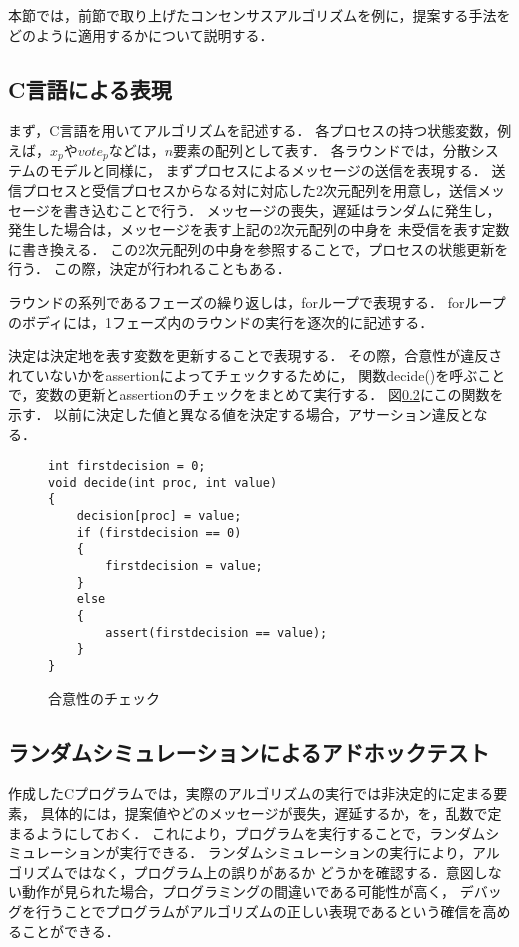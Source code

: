 \documentclass[technicalreport]{ieicej}
\theoremstyle{plain}
\begin{document}
本節では，前節で取り上げたコンセンサスアルゴリズムを例に，提案する手法をどのように適用するかについて説明する．

\subsection{C言語による表現}


まず，C言語を用いてアルゴリズムを記述する．
各プロセスの持つ状態変数，例えば，$x_p$や$vote_p$などは，$n$要素の配列として表す．
各ラウンドでは，分散システムのモデルと同様に，
まずプロセスによるメッセージの送信を表現する．
送信プロセスと受信プロセスからなる対に対応した2次元配列を用意し，送信メッセージを書き込むことで行う．
メッセージの喪失，遅延はランダムに発生し，発生した場合は，メッセージを表す上記の2次元配列の中身を
未受信を表す定数に書き換える．
この2次元配列の中身を参照することで，プロセスの状態更新を行う．
この際，決定が行われることもある．

ラウンドの系列であるフェーズの繰り返しは，forループで表現する．
forループのボディには，1フェーズ内のラウンドの実行を逐次的に記述する．

決定は決定地を表す変数を更新することで表現する．
その際，合意性が違反されていないかをassertionによってチェックするために，
関数decide()を呼ぶことで，変数の更新とassertionのチェックをまとめて実行する．
図\ref{}にこの関数を示す．
以前に決定した値と異なる値を決定する場合，アサーション違反となる．

\begin{figure}[t]
    \begin{verbatim}
int firstdecision = 0;
void decide(int proc, int value) 
{
    decision[proc] = value;
    if (firstdecision == 0)
    {
        firstdecision = value;
    }
    else
    {
        assert(firstdecision == value);
    }
}
    \end{verbatim}
\caption{合意性のチェック}\label{fig:assert}
\end{figure}          


\subsection{ランダムシミュレーションによるアドホックテスト}

作成したCプログラムでは，実際のアルゴリズムの実行では非決定的に定まる要素，
具体的には，提案値やどのメッセージが喪失，遅延するか，を，乱数で定まるようにしておく．
これにより，プログラムを実行することで，ランダムシミュレーションが実行できる．
ランダムシミュレーションの実行により，アルゴリズムではなく，プログラム上の誤りがあるか
どうかを確認する．意図しない動作が見られた場合，プログラミングの間違いである可能性が高く，
デバッグを行うことでプログラムがアルゴリズムの正しい表現であるという確信を高めることができる．
\end{document}
